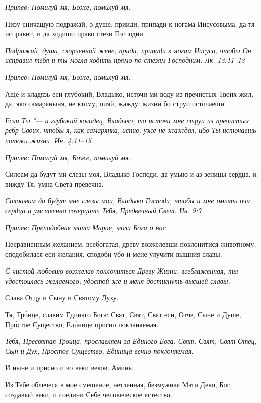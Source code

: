 \itshape Припев:\normalfont{} Помилуй мя, Боже, помилуй мя.


Низу сничащую подражай, о душе, прииди, припади к ногама Иисусовыма, да тя исправит, и да ходиши право стези Господни.


\itshape Подражай, душа, скорченной жене, приди, припади к ногам Иисуса, чтобы Он исправил тебя и ты могла ходить прямо по стезям Господним. Лк. 13:11–13\normalfont{}


\itshape Припев:\normalfont{} Помилуй мя, Боже, помилуй мя.


Аще и кладязь еси глубокий, Владыко, источи ми воду из пречистых Твоих жил, да, яко самаряныня, не ктому, пияй, жажду: жизни бо струи источаеши.


\itshape Если Ты "--- и глубокий колодец, Владыко, то источи мне струи из пречистых ребр Своих, чтобы я, как самарянка, испив, уже не жаждал, ибо Ты источаешь потоки жизни. Ин. 4:11–15\normalfont{}


\itshape Припев:\normalfont{} Помилуй мя, Боже, помилуй мя.


Силоам да будут ми слезы моя, Владыко Господи, да умыю и аз зеницы сердца, и вижду Тя, умна Света превечна.


\itshape Силоамом да будут мне слезы мои, Владыко Господи, чтобы и мне омыть очи сердца и умственно созерцать Тебя, Предвечный Свет. Ин. 9:7\normalfont{}


\itshape Припев:\normalfont{} Преподобная мати Марие, моли Бога о нас.


Несравненным желанием, всебогатая, древу возжелевши поклонитися животному, сподобилася еси желания, сподоби убо и мене улучити вышния славы.


\itshape С чистой любовию возжелав поклониться Древу Жизни, всеблаженная, ты удостоилась желаемого; удостой же и меня достигнуть высшей славы.\normalfont{}


Слава Отцу и Сыну и Святому Духу.


Тя, Тро́ице, славим Единаго Бога: Свят, Свят, Свят еси, Отче, Сыне и Душе, Про́стое Существо, Еди́нице присно покланяемая.


\itshape Тебя, Пресвятая Троица, прославляем за Единого Бога: Свят, Свят, Свят Отец, Сын и Дух, Простое Существо, Единица вечно поклоняемая.\normalfont{}


И ныне и присно и во веки веков. Аминь.


Из Тебе облечеся в мое смешение, нетленная, безмужная Мати Дево, Бог, создавый веки, и соедини Себе человеческое естество.


